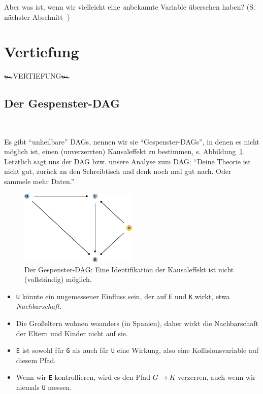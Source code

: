 \documentclass[
  a4paper,
  DIV=11]{scrreprt}
\theoremstyle{definition}
\theoremstyle{remark}
\begin{document}
Aber was ist, wenn wir vielleicht eine \emph{u}nbekannte Variable
übersehen haben? (S. nächster Abschnitt 👻)

\hypertarget{vertiefung-3}{%
\section{Vertiefung}\label{vertiefung-3}}

🏎️VERTIEFUNG🏎️

\hypertarget{der-gespenster-dag}{%
\subsection{Der Gespenster-DAG}\label{der-gespenster-dag}}

👻

Es gibt ``unheilbare'' DAGs, nennen wir sie ``Gespenster-DAGs'', in
denen es nicht möglich ist, einen (unverzerrten) Kausaleffekt zu
bestimmen, s. Abbildung~\ref{fig-dag-ghost}. Letztlich sagt uns der DAG
bzw. unsere Analyse zum DAG: ``Deine Theorie ist nicht gut, zurück an
den Schreibtisch und denk noch mal gut nach. Oder sammele mehr Daten.''

\begin{figure}

{\centering \includegraphics[width=0.5\textwidth,height=\textheight]{./kausal_files/figure-pdf/fig-dag-ghost-1.pdf}

}

\caption{\label{fig-dag-ghost}Der Gespenster-DAG: Eine Identifikation
der Kausaleffekt ist nicht (vollständig) möglich.}

\end{figure}

\begin{itemize}
\item
  \texttt{U} könnte ein ungemessener Einfluss sein, der auf \texttt{E}
  und \texttt{K} wirkt, etwa \emph{Nachbarschaft}.
\item
  Die Großeltern wohnen woanders (in Spanien), daher wirkt die
  Nachbarschaft der Eltern und Kinder nicht auf sie.
\item
  \texttt{E} ist sowohl für \texttt{G} als auch für \texttt{U} eine
  Wirkung, also eine Kollisionsvariable auf diesem Pfad.
\item
  Wenn wir \texttt{E} kontrollieren, wird es den Pfad
  \(G \rightarrow K\) verzerren, auch wenn wir niemals \texttt{U}
  messen.
\end{itemize}
\end{document}
